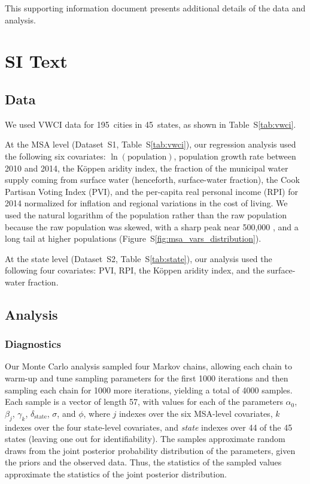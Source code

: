\documentclass[draft]{agujournal}
\begin{document}
This supporting information document presents additional details of the data and analysis.

\section*{SI Text}

\subsection*{Data}
We used VWCI data for 195~cities in 45~states, as shown in Table~S\ref{tab:vwci}.

At the MSA level (Dataset~S1, Table~S\ref{tab:vwci}), our regression analysis used the following six covariates: $\ln(\text{population})$, population growth rate between 2010 and 2014, the K\"oppen aridity index, the fraction of the municipal water supply coming from surface water (henceforth, surface-water fraction), the Cook Partisan Voting Index (PVI), and the per-capita real personal income (RPI) for 2014 normalized for inflation and regional variations in the cost of living. We used the natural logarithm of the population rather than the raw population because the raw population was
skewed, with a sharp peak near 500,000%
, and a long tail at higher populations
(Figure~S\ref{fig:msa_vars_distribution}).

At the state level (Dataset~S2, Table~S\ref{tab:state}), our analysis used the following four covariates: PVI, RPI, the K\"oppen aridity index, and the surface-water fraction.



\subsection*{Analysis}

\subsubsection*{Diagnostics}

\iftrue
Our Monte Carlo analysis sampled four Markov chains,
allowing each chain to warm-up and tune sampling parameters for
the first 1000 iterations
and then sampling each chain for 1000 more iterations,
yielding a total of 4000 samples.
Each sample is a vector of length 57,
with values for each of the parameters
$\alpha_0$, $\beta_j$, $\gamma_k$, $\delta_{\text{state}}$, $\sigma$, and $\phi$,
where $j$ indexes over the six MSA-level covariates,
$k$ indexes over the four state-level covariates,
and \emph{state\/} indexes over
44 of the 45 states (leaving one out for
identifiability).
The samples approximate random draws from the joint posterior probability
distribution of the parameters, given the priors and the observed
data. Thus, the statistics of the sampled values approximate the statistics
of the joint posterior distribution.
\end{document}
